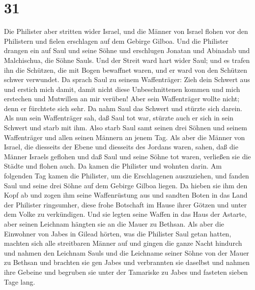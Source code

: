 \hypertarget{section-30}{%
\section{31}\label{section-30}}

 Die Philister aber stritten wider Israel, und die Männer
von Israel flohen vor den Philistern und fielen erschlagen auf dem
Gebirge Gilboa.  Und die Philister drangen ein auf Saul
und seine Söhne und erschlugen Jonatan und Abinadab und Malchischua, die
Söhne Sauls.  Und der Streit ward hart wider Saul; und es
trafen ihn die Schützen, die mit Bogen bewaffnet waren, und er ward von
den Schützen schwer verwundet.  Da sprach Saul zu seinem
Waffenträger: Zieh dein Schwert aus und erstich mich damit, damit nicht
diese Unbeschnittenen kommen und mich erstechen und Mutwillen an mir
verüben! Aber sein Waffenträger wollte nicht; denn er fürchtete sich
sehr. Da nahm Saul das Schwert und stürzte sich darein. 
Als nun sein Waffenträger sah, daß Saul tot war, stürzte auch er sich in
sein Schwert und starb mit ihm.  Also starb Saul samt
seinen drei Söhnen und seinem Waffenträger und allen seinen Männern an
jenem Tag.  Als aber die Männer von Israel, die diesseits
der Ebene und diesseits des Jordans waren, sahen, daß die Männer Israels
geflohen und daß Saul und seine Söhne tot waren, verließen sie die
Städte und flohen auch. Da kamen die Philister und wohnten darin.
 Am folgenden Tag kamen die Philister, um die Erschlagenen
auszuziehen, und fanden Saul und seine drei Söhne auf dem Gebirge Gilboa
liegen.  Da hieben sie ihm den Kopf ab und zogen ihm seine
Waffenrüstung aus und sandten Boten in das Land der Philister
ringsumher, diese frohe Botschaft im Hause ihrer Götzen und unter dem
Volke zu verkündigen.  Und sie legten seine Waffen in das
Haus der Astarte, aber seinen Leichnam hängten sie an die Mauer zu
Bethsan.  Als aber die Einwohner von Jabes in Gilead
hörten, was die Philister Saul getan hatten,  machten
sich alle streitbaren Männer auf und gingen die ganze Nacht hindurch und
nahmen den Leichnam Sauls und die Leichname seiner Söhne von der Mauer
zu Bethsan und brachten sie gen Jabes und verbrannten sie daselbst
 und nahmen ihre Gebeine und begruben sie unter der
Tamariske zu Jabes und fasteten sieben Tage lang.
